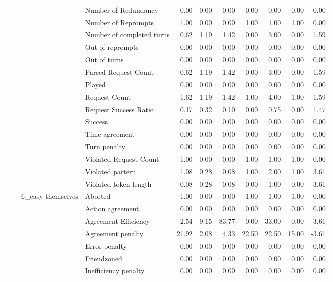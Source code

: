 \begin{tabular}{llllrrrrrrr}
 &  &  & Number of Redundancy & 0.00 & 0.00 & 0.00 & 0.00 & 0.00 & 0.00 & 0.00 \\
 &  &  & Number of Reprompts & 1.00 & 0.00 & 0.00 & 1.00 & 1.00 & 1.00 & 0.00 \\
 &  &  & Number of completed turns & 0.62 & 1.19 & 1.42 & 0.00 & 3.00 & 0.00 & 1.59 \\
 &  &  & Out of reprompts & 0.00 & 0.00 & 0.00 & 0.00 & 0.00 & 0.00 & 0.00 \\
 &  &  & Out of turns & 0.00 & 0.00 & 0.00 & 0.00 & 0.00 & 0.00 & 0.00 \\
 &  &  & Parsed Request Count & 0.62 & 1.19 & 1.42 & 0.00 & 3.00 & 0.00 & 1.59 \\
 &  &  & Played & 0.00 & 0.00 & 0.00 & 0.00 & 0.00 & 0.00 & 0.00 \\
 &  &  & Request Count & 1.62 & 1.19 & 1.42 & 1.00 & 4.00 & 1.00 & 1.59 \\
 &  &  & Request Success Ratio & 0.17 & 0.32 & 0.10 & 0.00 & 0.75 & 0.00 & 1.47 \\
 &  &  & Success & 0.00 & 0.00 & 0.00 & 0.00 & 0.00 & 0.00 & 0.00 \\
 &  &  & Time agreement & 0.00 & 0.00 & 0.00 & 0.00 & 0.00 & 0.00 & 0.00 \\
 &  &  & Turn penalty & 0.00 & 0.00 & 0.00 & 0.00 & 0.00 & 0.00 & 0.00 \\
 &  &  & Violated Request Count & 1.00 & 0.00 & 0.00 & 1.00 & 1.00 & 1.00 & 0.00 \\
 &  &  & Violated pattern & 1.08 & 0.28 & 0.08 & 1.00 & 2.00 & 1.00 & 3.61 \\
 &  &  & Violated token length & 0.08 & 0.28 & 0.08 & 0.00 & 1.00 & 0.00 & 3.61 \\
\cline{3-11}
 &  & \multirow[t]{27}{*}{6_easy-themselves} & Aborted & 1.00 & 0.00 & 0.00 & 1.00 & 1.00 & 1.00 & 0.00 \\
 &  &  & Action agreement & 0.00 & 0.00 & 0.00 & 0.00 & 0.00 & 0.00 & 0.00 \\
 &  &  & Agreement Efficiency & 2.54 & 9.15 & 83.77 & 0.00 & 33.00 & 0.00 & 3.61 \\
 &  &  & Agreement penalty & 21.92 & 2.08 & 4.33 & 22.50 & 22.50 & 15.00 & -3.61 \\
 &  &  & Error penalty & 0.00 & 0.00 & 0.00 & 0.00 & 0.00 & 0.00 & 0.00 \\
 &  &  & Friendzoned & 0.00 & 0.00 & 0.00 & 0.00 & 0.00 & 0.00 & 0.00 \\
 &  &  & Inefficiency penalty & 0.00 & 0.00 & 0.00 & 0.00 & 0.00 & 0.00 & 0.00 \\

\end{tabular}
